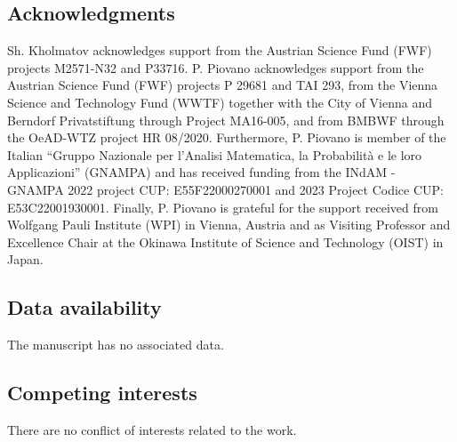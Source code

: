 \documentclass[reqno]{amsart}
\numberwithin{equation}{section}
\theoremstyle{plain}
\theoremstyle{definition}
\begin{document}
 

 
\subsection*{Acknowledgments} 

Sh. Kholmatov acknowledges support from the Austrian Science Fund (FWF) projects M2571-N32 and P33716. P. Piovano acknowledges support from the Austrian Science Fund (FWF) projects P 29681 and TAI 293, from the Vienna Science and Technology Fund (WWTF) together with the City of Vienna and Berndorf Privatstiftung through Project MA16-005, and from BMBWF through the OeAD-WTZ project HR 08/2020. Furthermore, P. Piovano is member of the Italian ``Gruppo Nazionale per l'Analisi Matematica, la Probabilit\`a e le loro Applicazioni'' (GNAMPA) and has received funding from the  INdAM - GNAMPA  2022 project CUP: E55F22000270001 and 2023 Project Codice CUP: E53C22001930001.
Finally, P. Piovano is grateful for the support received from Wolfgang Pauli Institute (WPI) in Vienna, Austria and as Visiting Professor and Excellence Chair at the Okinawa Institute of Science and Technology (OIST) in Japan.

 
\subsection*{Data availability}

The manuscript has no associated data.

\subsection*{Competing interests}

There are no conflict of interests related to the work.
\end{document}
